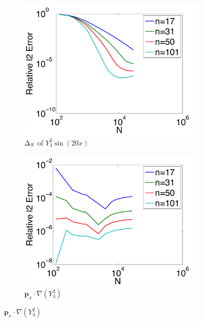 \begin{figure}[htbp]
	\centering
	\begin{subfigure}[b]{0.48\textwidth}
	\includegraphics[width=1.0\textwidth]{../figures/appendices/direct_vs_indirect_weights/compare_weight_generation/lsfc_vs_px_grad_dot_px_grad/direct_rel_l2_error.pdf}
	\caption{$\LaplaceBeltrami$ of $Y_{3}^{2} \sin(20 x)$}
		\end{subfigure}
	\begin{subfigure}[b]{0.48\textwidth}
	\includegraphics[width=1.0\textwidth]{../figures/appendices/direct_vs_indirect_weights/compare_weight_generation/xsfc_vs_xsfc_alt_on_sph32/direct_rel_l2_error.pdf}
	\caption{$\mathbf{p}_{x} \cdot \nabla ( Y_{3}^{2})$ }
	\end{subfigure}

\end{figure}
